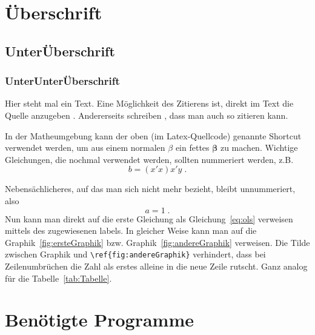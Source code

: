 \documentclass[a4paper,12pt]{article}
\newcommand{\bs}{\boldsymbol}  %
\begin{document}
% 
% 




\setcounter{page}{1}        %


\section{\"Uberschrift}
\label{Kapitel1}

\subsection{Unter\"Uberschrift}

\subsubsection*{UnterUnter\"Uberschrift}



Hier steht mal ein Text. Eine M\"oglichkeit des Zitierens ist, direkt
im Text die Quelle anzugeben \citep[see][pp.225-369]{key1}.
Andererseits schreiben \cite{key2}, dass man auch so zitieren kann.

In der Matheumgebung kann der oben (im Latex-Quellcode) genannte Shortcut verwendet
werden, um aus einem normalen $\beta$ ein fettes $\bs \beta$ zu
machen. Wichtige Gleichungen, die nochmal verwendet werden, sollten nummeriert werden, z.B.
\begin{equation}
\label{eq:ols}
   b = (x'x)x'y \;.
\end{equation}

Nebens\"achlicheres, auf das man sich nicht mehr bezieht, bleibt unnummeriert, also 
\begin{equation*}
   a = 1\;.
\end{equation*}
Nun kann man direkt auf die erste Gleichung als Gleichung~\eqref{eq:ols} verweisen mittels des zugewiesenen labels. In gleicher Weise kann man auf die Graphik~\ref{fig:ersteGraphik} bzw. Graphik~\ref{fig:andereGraphik} verweisen. Die Tilde zwischen \glqq Graphik\grqq{} und \glqq \verb|\ref{fig:andereGraphik}|\grqq{} verhindert, dass bei Zeilenumbr\"uchen die Zahl als erstes alleine in die neue Zeile rutscht. Ganz analog f\"ur die Tabelle~\ref{tab:Tabelle}. 



\section{Ben\"otigte Programme}
\end{document}
